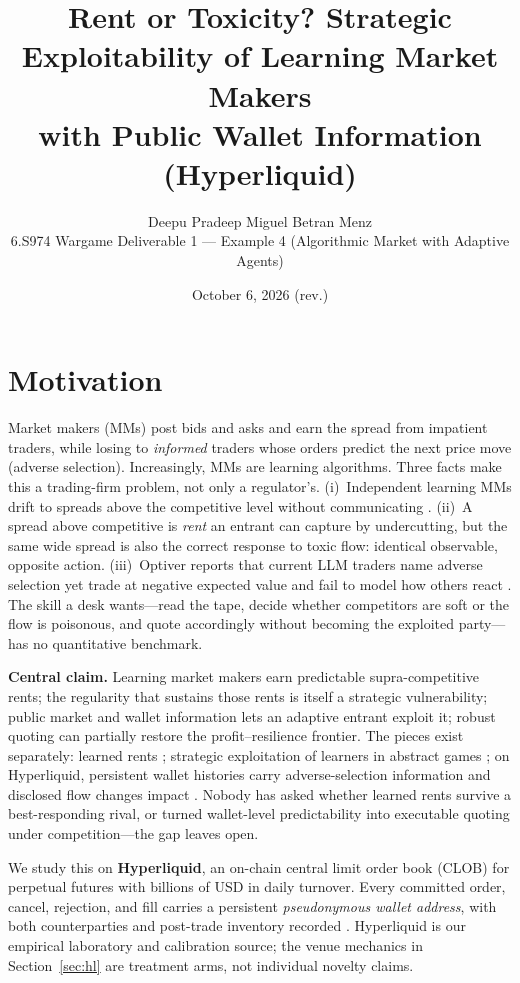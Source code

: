 \documentclass[11pt]{article}
\title{\vspace{-1.2em}\large\textbf{Rent or Toxicity? Strategic Exploitability of Learning Market Makers\\ with Public Wallet Information (Hyperliquid)}\vspace{-0.4em}}
\author{\normalsize Deepu Pradeep \quad Miguel Betran Menz \\
\normalsize 6.S974 Wargame Deliverable 1 --- Example 4 (Algorithmic Market with Adaptive Agents)}
\date{\normalsize October 6, 2026 (rev.)\vspace{-1.5em}}
\begin{document}
\maketitle

\section*{Motivation}
Market makers (MMs) post bids and asks and earn the spread from impatient traders, while losing to \emph{informed} traders whose orders predict the next price move (adverse selection). Increasingly, MMs are learning algorithms. Three facts make this a trading-firm problem, not only a regulator's. (i)~Independent learning MMs drift to spreads above the competitive level without communicating \cite{contxiong,cfl}. (ii)~A spread above competitive is \emph{rent} an entrant can capture by undercutting, but the same wide spread is also the correct response to toxic flow: identical observable, opposite action. (iii)~Optiver reports that current LLM traders name adverse selection yet trade at negative expected value and fail to model how others react \cite{optiver}. The skill a desk wants---read the tape, decide whether competitors are soft or the flow is poisonous, and quote accordingly without becoming the exploited party---has no quantitative benchmark.

\textbf{Central claim.} Learning market makers earn predictable supra-competitive rents; the regularity that sustains those rents is itself a strategic vulnerability; public market and wallet information lets an adaptive entrant exploit it; robust quoting can partially restore the profit--resilience frontier. The pieces exist separately: learned rents \cite{cfl,contxiong}; strategic exploitation of learners in abstract games \cite{dss,brownmackay}; on Hyperliquid, persistent wallet histories carry adverse-selection information \cite{zhai} and disclosed flow changes impact \cite{barone}. Nobody has asked whether learned rents survive a best-responding rival, or turned wallet-level predictability into executable quoting under competition---the gap \cite{zhai} leaves open.

We study this on \textbf{Hyperliquid}, an on-chain central limit order book (CLOB) for perpetual futures with billions of USD in daily turnover. Every committed order, cancel, rejection, and fill carries a persistent \emph{pseudonymous wallet address}, with both counterparties and post-trade inventory recorded \cite{albers}. Hyperliquid is our empirical laboratory and calibration source; the venue mechanics in Section~\ref{sec:hl} are treatment arms, not individual novelty claims.
\end{document}
